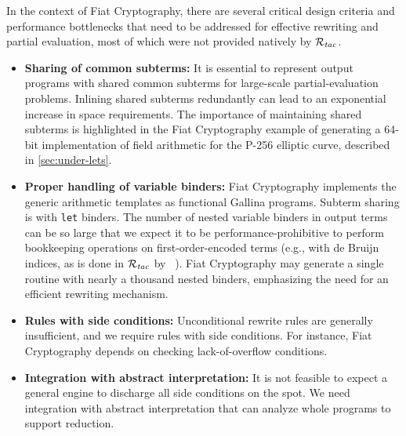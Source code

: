 \documentclass[sn-mathphys,pdflatex]{sn-jnl}%
\makeatletter
\renewcommand{\todo}[2][]{\tikzexternaldisable\@todo[#1]{#2}\tikzexternalenable}
\newcommand{\citetfield}[1]{\usebibentry{#1}{citet}~\cite{#1}}
\newcommand{\Rtac}{\ensuremath{\mathcal{R}_\text{\emph{tac}}}}
\theoremstyle{thmstyleone}%
\theoremstyle{thmstyletwo}%
\theoremstyle{thmstylethree}%
\makeatother
\begin{document}
In the context of Fiat Cryptography, there are several critical design criteria and performance bottlenecks that need to be addressed for effective rewriting and partial evaluation, most of which were not provided natively by \Rtac{}.

\begin{itemize}
\item \textbf{Sharing of common subterms:}
  It is essential to represent output programs with shared common subterms for large-scale partial-evaluation problems.
 Inlining shared subterms redundantly can lead to an exponential increase in space requirements.
 The importance of maintaining shared subterms is highlighted in the Fiat Cryptography example of generating a 64-bit implementation of field arithmetic for the P-256 elliptic curve, described in \autoref{sec:under-lets}.

\item \textbf{Proper handling of variable binders:}
  Fiat Cryptography implements the generic arithmetic templates as functional Gallina programs.
  Subterm sharing is  with \texttt{let} binders.
  The number of nested variable binders in output terms can be so large that we expect it to be performance-prohibitive to perform bookkeeping operations on first-order-encoded terms (e.g., with de Bruijn indices, as is done in \Rtac{} by \citetfield{rtac}).
  Fiat Cryptography may generate a single routine with nearly a thousand nested binders, emphasizing the need for an efficient rewriting mechanism.

\item \textbf{Rules with side conditions:}
  Unconditional rewrite rules are generally insufficient, and we require rules with side conditions.
  For instance, Fiat Cryptography depends on checking lack-of-overflow conditions.

\item \textbf{Integration with abstract interpretation:}
  It is not feasible to expect a general engine to discharge all side conditions on the spot.
  We need integration with abstract interpretation that can analyze whole programs to support reduction.


\end{itemize}
\end{document}
